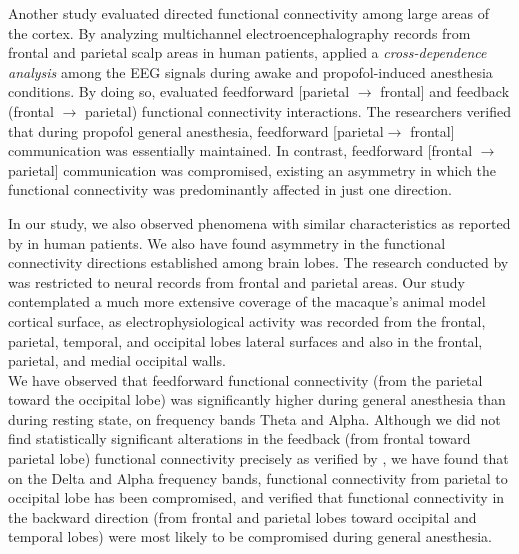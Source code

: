 \documentclass[twoside]{article}
\begin{document}
\begin{multicols}{2}
Another study evaluated directed functional connectivity among large areas of the cortex. By analyzing multichannel electroencephalography records from frontal and parietal scalp areas in human patients, \citep{lee2009directionality} applied a \textit{cross-dependence analysis} \citep{rosenblum2001detecting} among the EEG signals during awake and propofol-induced anesthesia conditions. By doing so, \citep{lee2009directionality} evaluated feedforward \citep{lee2009directionality} [parietal $ \rightarrow $ frontal] and feedback \citep{lee2009directionality} (frontal $ \rightarrow $ parietal) functional connectivity interactions. The researchers \citep{lee2009directionality} verified that during propofol general anesthesia, feedforward [parietal$ \rightarrow $ frontal] communication was essentially maintained. In contrast, feedforward [frontal $ \rightarrow $ parietal] communication was compromised, existing an asymmetry in which the functional connectivity was predominantly affected in just one direction.
 
 
 
In our study, we also observed phenomena with similar characteristics as reported by \citep{lee2009directionality} in human patients. We also have found asymmetry in the functional connectivity directions established among brain lobes. The research conducted by \citep{lee2009directionality} was restricted to neural records from frontal and parietal areas. Our study contemplated a much more extensive coverage of the macaque's animal model cortical surface, as electrophysiological activity was recorded from the frontal, parietal, temporal, and occipital lobes lateral surfaces and also in the frontal, parietal, and medial occipital walls.\\



 We have observed that feedforward functional connectivity (from the parietal toward the occipital lobe) was significantly higher during general anesthesia than during resting state, on frequency bands Theta and Alpha. Although we did not find statistically significant alterations in the feedback (from frontal toward parietal lobe) functional connectivity precisely as verified by \citep{lee2009directionality}, we have found that on the Delta and Alpha frequency bands, functional connectivity from parietal to occipital lobe has been compromised, and verified that functional connectivity in the backward direction (from frontal and parietal lobes toward occipital and temporal lobes) were most likely to be compromised during general anesthesia.
 



\end{multicols}
\end{document}
